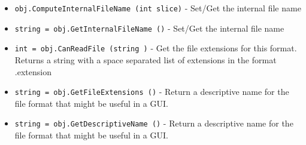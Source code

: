 \begin{itemize}
\item  \verb|obj.ComputeInternalFileName (int slice)| -  Set/Get the internal file name

\item  \verb|string = obj.GetInternalFileName ()| -  Set/Get the internal file name

\item  \verb|int = obj.CanReadFile (string )| -  Get the file extensions for this format.
 Returns a string with a space separated list of extensions in 
 the format .extension

\item  \verb|string = obj.GetFileExtensions ()| -  Return a descriptive name for the file format that might be useful in a GUI.

\item  \verb|string = obj.GetDescriptiveName ()| -  Return a descriptive name for the file format that might be useful in a GUI.

\end{itemize}
